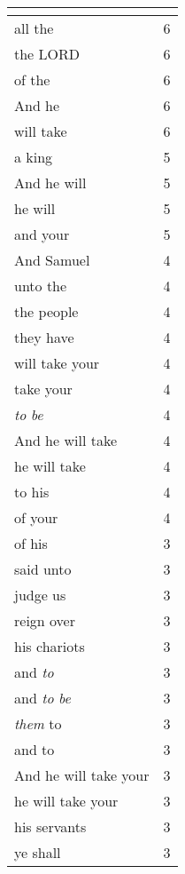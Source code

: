 \begin{center}
\begin{longtable}{|p{3.0in}|p{0.5in}|}
\hline \multicolumn{2}{c}{{ }} \\ \hline
\endfoot 
all the & 6\\ \hline 
the LORD & 6\\ \hline 
of the & 6\\ \hline 
And he & 6\\ \hline 
will take & 6\\ \hline 
a king & 5\\ \hline 
And he will & 5\\ \hline 
he will & 5\\ \hline 
and your & 5\\ \hline 
And Samuel & 4\\ \hline 
unto the & 4\\ \hline 
the people & 4\\ \hline 
they have & 4\\ \hline 
will take your & 4\\ \hline 
take your & 4\\ \hline 
\emph{to} \emph{be} & 4\\ \hline 
And he will take & 4\\ \hline 
he will take & 4\\ \hline 
to his & 4\\ \hline 
of your & 4\\ \hline 
of his & 3\\ \hline 
said unto & 3\\ \hline 
judge us & 3\\ \hline 
reign over & 3\\ \hline 
his chariots & 3\\ \hline 
and \emph{to} & 3\\ \hline 
and \emph{to} \emph{be} & 3\\ \hline 
\emph{them} to & 3\\ \hline 
and to & 3\\ \hline 
And he will take your & 3\\ \hline 
he will take your & 3\\ \hline 
his servants & 3\\ \hline 
ye shall & 3\\ \hline 
\end{longtable}
\end{center}






